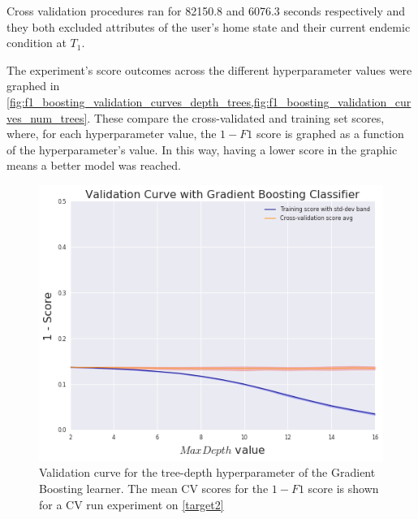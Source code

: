 Cross validation procedures ran for 82150.8
 and 6076.3 seconds respectively and they both excluded attributes of the user's home state and their current endemic condition at $T_1$.

The experiment's score outcomes across the different hyperparameter values were graphed in \cref{fig:f1_boosting_validation_curves_depth_trees,fig:f1_boosting_validation_curves_num_trees}.
These compare the cross-validated and training set scores, where, for each hyperparameter value, the $1-F1$ score is graphed as a function of the hyperparameter's value.
In this way, having a lower score in the graphic means a better model was reached.

\begin{figure}[h!]
	\begin{center}
		\includegraphics[width=1\linewidth]{figures/gradient-boosting/validation_curve_boosting_depth_series_f1}
		\caption{ Validation curve for the tree-depth hyperparameter of the Gradient Boosting learner. 
		The mean CV scores for the $1 - F1$ score is shown for a CV run experiment on \cref{target2}}
		\label{fig:f1_boosting_validation_curves_depth_trees}

	\end{center}
\end{figure}


